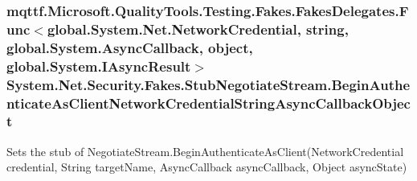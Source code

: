 \hypertarget{class_system_1_1_net_1_1_security_1_1_fakes_1_1_stub_negotiate_stream_a536ef382ed5266bccd400b9739ecd7f3}{
\subsubsection[{Begin\-Authenticate\-As\-Client\-Network\-Credential\-String\-Async\-Callback\-Object}]{\setlength{\rightskip}{0pt plus 5cm}mqttf.\-Microsoft.\-Quality\-Tools.\-Testing.\-Fakes.\-Fakes\-Delegates.\-Func$<$global.\-System.\-Net.\-Network\-Credential, string, global.\-System.\-Async\-Callback, object, global.\-System.\-I\-Async\-Result$>$ System.\-Net.\-Security.\-Fakes.\-Stub\-Negotiate\-Stream.\-Begin\-Authenticate\-As\-Client\-Network\-Credential\-String\-Async\-Callback\-Object}}\label{class_system_1_1_net_1_1_security_1_1_fakes_1_1_stub_negotiate_stream_a536ef382ed5266bccd400b9739ecd7f3}


Sets the stub of Negotiate\-Stream.\-Begin\-Authenticate\-As\-Client(\-Network\-Credential credential, String target\-Name, Async\-Callback async\-Callback, Object async\-State)

